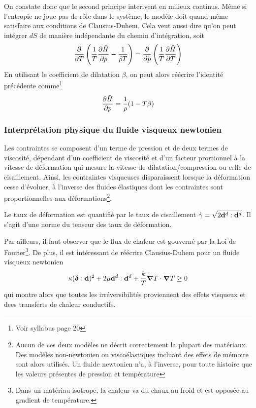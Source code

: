 \documentclass[a4paper,11pt]{report}
\newcommand{\bs}[1]{\boldsymbol{#1}}
\newcommand{\recip}[1]{\frac{1}{#1}}
\begin{document}
        On constate donc que le second principe interivent en milieux continus. Même si l'entropie ne joue pas de rôle dans le système, le modèle doit quand même satisfaire aux conditions de Clausius-Duhem. Cela veut aussi dire qu'on peut intégrer $dS$ de manière indépendante du chemin d'intégration, soit
        \begin{equation}
          \pdv{}{T}\left(\frac{1}{T}\pdv{\hat{H}}{p} - \frac{1}{\hat{\rho}T}\right) = \pdv{}{p}\left(\frac{1}{T}\pdv{\hat{H}}{T}\right)
        \end{equation}
        En utilisant le coefficient de dilatation $\beta$, on peut alors réécrire l'identité précédente comme\footnote{Voir syllabus page 20}
        \begin{equation}
          \pdv{\hat{H}}{p} = \recip{\rho}(1-T\beta)
        \end{equation}

        \subsubsection{Interprétation physique du fluide visqueux newtonien}
          Les contraintes se composent d'un terme de pression et de deux termes de viscosité, dépendant d'un coefficient de viscosité et d'un facteur prortionnel à la vitesse de déformation qui mesure la vitesse de dilatation/compression ou celle de cisaillement. Ainsi, les contraintes visqueuses disparaîssent lorsque la déformation cesse d'évoluer, à l'inverse des fluides élastiques dont les contraintes sont proportionnelles aux déformations\footnote{Aucun de ces deux modèles ne décrit correctement la plupart des matériaux. Des modèles non-newtonien ou viscoélastiques incluant des effets de mémoire sont alors utilisés. Un fluide newtonien n'a, à l'inverse, pour toute histoire que les valeurs présentes de pression et température}.

          Le taux de déformation est quantifié par le taux de cisaillement $\dot{\gamma} = \sqrt{2\vb{d}^d:\vb{d}^d}$. Il s'agit d'une norme du tenseur des taux de déformation.

          Par ailleurs, il faut observer que le flux de chaleur est gouverné par la Loi de Fourier\footnote{Dans un matériau isotrope, la chaleur va du chaux au froid et est opposée au gradient de température.}. De plus, il est intéressant de réécrire Clausius-Duhem pour un fluide visqueux newtonien
          \begin{equation}
            \kappa (\bs{\delta}:\vb{d})^2 + 2 \mu \vb{d}^d : \vb{d}^d + \frac{k}{T}\grad T \cdot \grad T \geq 0
          \end{equation}
          qui montre alors que toutes les irréversibilités proviennent des effets visqueux et dees transferts de chaleur conductifs.
\end{document}
